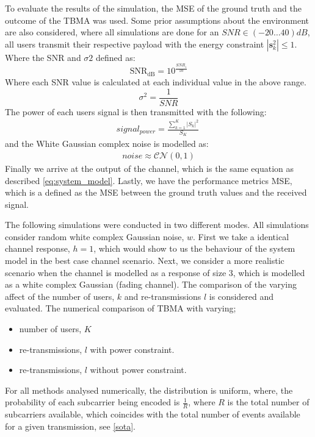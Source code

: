 \documentclass{article}
\begin{document}
To evaluate the results of the simulation, the \ac{MSE} of the ground truth and the outcome of the TBMA was used. Some prior assumptions about the environment are also considered, where all simulations are done for an $SNR \in (-20\dots40)dB$, all users transmit their respective payload with the energy constraint  $|\textbf{s}_{k}^2| \leq 1$.  
Where the SNR and $\sigma2$ defined as:
\begin{equation} 
\text{SNR}_{\text{dB}} = 10^{\frac{SNR_{i}}{10}}    
\end{equation}
Where each SNR value is calculated at each individual value in the above range.
\begin{equation}
    \sigma^2 = \frac{1}{SNR}
\end{equation}
The power of each users signal is then transmitted with the following:
\begin{align}
    signal_{power} = \frac{\sum\limits_{k=1}^{K}|S_{k}|^2 }{S_{K}} \     
\end{align}
and the White Gaussian complex noise is modelled as:
\begin{align}
    noise \approx \mathcal{CN}(0,1)
\end{align}
Finally we arrive at the output of the channel, which is the same equation as described \cref{eq:system_model}. Lastly, we have the performance metrics MSE, which is a defined as the MSE between the ground truth values and the received signal.

The following simulations were conducted in two different modes. All simulations consider random white complex Gaussian noise, $w$. First we take a identical channel response, $h=1$, which would show to us the behaviour of the system model in the best case channel scenario. Next, we consider a more realistic scenario when the channel is modelled as a response of size 3, which is modelled as a white complex Gaussian (fading channel). The comparison of the varying affect of the number of users, $k$ and re-transmissions $l$ is considered and evaluated. 
The numerical comparison of TBMA with varying;
\begin{itemize}
    \item number of users, $K$
    \item re-transmissions, $l$ with power constraint.    
    \item re-transmissions, $l$ without power constraint.
\end{itemize}

For all methods analysed numerically, the distribution is uniform, where, the probability of each subcarrier being encoded is $\frac{1}{R}$, where $R$ is the total number of subcarriers available, which coincides with the total number of events available for a given transmission, see \cref{sota}. 
  
\end{document}
